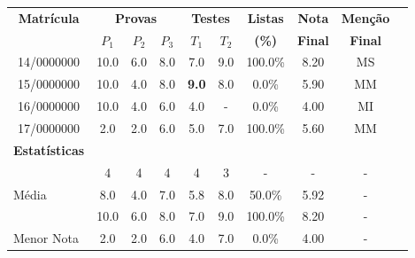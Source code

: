 \begin{longtable}{cccccccccc}
\toprule
\multirow{2}{*}{\textbf{Matrícula}} & \multicolumn{3}{c}{\textbf{Provas}} & \multicolumn{2}{c}{\textbf{Testes}} & \textbf{Listas} & \textbf{Nota} & \textbf{Menção} \\
 & \textbf{$P_1$} & \textbf{$P_2$} & \textbf{$P_3$} & \textbf{$T_1$} & \textbf{$T_2$} & \textbf{(\%)} & \textbf{Final} & \textbf{Final} \\
\toprule
\rowcolor[gray]{.9}
14/0000000 & 10.0 & 6.0 & 8.0 & 7.0 & 9.0 & 100.0\% & 8.20 & MS \\
15/0000000 & 10.0 & 4.0 & 8.0 & \textbf{9.0} & 8.0 & 0.0\% & 5.90 & MM \\
\rowcolor[gray]{.9}
16/0000000 & 10.0 & 4.0 & 6.0 & 4.0 & - & 0.0\% & 4.00 & MI \\
17/0000000 & 2.0 & 2.0 & 6.0 & 5.0 & 7.0 & 100.0\% & 5.60 & MM \\
\toprule
\textbf{Estatísticas} & \multicolumn{9}{c}{} \\
\toprule
\rowcolor[gray]{.9}
\multicolumn{1}{l}{Presentes} & 4 & 4 & 4 & 4 & 3 & - & - & - \\
\multicolumn{1}{l}{Média} & 8.0 & 4.0 & 7.0 & 5.8 & 8.0 & 50.0\% & 5.92 & - \\
\rowcolor[gray]{.9}
\multicolumn{1}{l}{Maior Nota} & 10.0 & 6.0 & 8.0 & 7.0 & 9.0 & 100.0\% & 8.20 & - \\
\multicolumn{1}{l}{Menor Nota} & 2.0 & 2.0 & 6.0 & 4.0 & 7.0 & 0.0\% & 4.00 & - \\
\bottomrule
\end{longtable}
